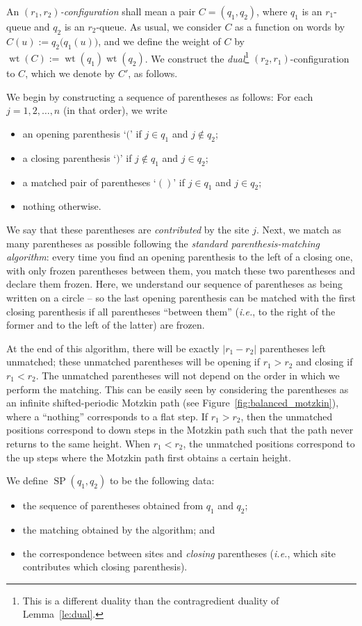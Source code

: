 \documentclass[reqno]{amsart}
\newcommand{\0}{\phantom{c}}
\DeclareMathOperator{\wt}{wt} %
\DeclareMathOperator{\SP}{SP} %
\newcommand{\abs}[1]{\left| #1 \right|}
\newcommand{\defn}[1]{{\color{darkred}\emph{#1}}} %
\theoremstyle{plain}
\theoremstyle{definition}
\numberwithin{equation}{section}
\begin{document}
An \defn{$(r_1,r_2)$-configuration} shall mean a pair $C = (q_1, q_2)$, where $q_1$ is an $r_1$-queue and $q_2$ is an $r_2$-queue.
As usual, we consider $C$ as a function on words by $C(u) := q_2\bigr(q_1(u)\bigr)$, and we define the weight of $C$ by $\wt(C) := \wt(q_1) \wt(q_2)$.
We construct the \defn{dual}\footnote{This is a different duality than the contragredient duality of Lemma~\ref{le:dual}.} $(r_2,r_1)$-configuration to $C$, which we denote by $C'$, as follows.

We begin by constructing a sequence of parentheses as follows: For each $j = 1, 2, \dotsc, n$ (in that order), we write
\begin{itemize}
\item an opening parenthesis `$($' if $j \in q_1$ and $j \notin q_2$;
\item a closing parenthesis `$)$' if $j \notin q_1$ and $j \in q_2$;
\item a matched pair of parentheses `$()$' if $j \in q_1$ and $j \in q_2$;
\item nothing otherwise.
\end{itemize}
We say that these parentheses are \defn{contributed} by the site $j$.
Next, we match as many parentheses as possible following the \defn{standard parenthesis-matching algorithm}:
every time you find an opening parenthesis to the left of a closing one, with only frozen parentheses between them, you match these two parentheses and declare them frozen.
Here, we understand our sequence of parentheses as being written on a circle -- so the last opening parenthesis can be matched with the first closing parenthesis if all parentheses ``between them'' (\textit{i.e.}, to the right of the former and to the left of the latter) are frozen.

At the end of this algorithm, there will be exactly $\abs{r_1 - r_2}$ parentheses left unmatched; these unmatched parentheses will be opening if $r_1 > r_2$ and closing if $r_1 < r_2$. The unmatched parentheses will not depend on the order in which we perform the matching.
This can be easily seen by considering the parentheses as an infinite shifted-periodic Motzkin path (see Figure~\ref{fig:balanced_motzkin}), where a ``nothing'' corresponds to a flat step.
If $r_1 > r_2$, then the unmatched positions correspond to down steps in the Motzkin path such that the path never returns to the same height.
When $r_1 < r_2$, the unmatched positions correspond to the up steps where the Motzkin path first obtains a certain height.

We define \defn{$\SP(q_1, q_2)$} to be the following data:
\begin{itemize}
\item the sequence of parentheses obtained from $q_1$ and $q_2$;
\item the matching obtained by the algorithm; and
\item the correspondence between sites and \emph{closing} parentheses (\textit{i.e.}, which site contributes which closing parenthesis).
\end{itemize}
\end{document}
